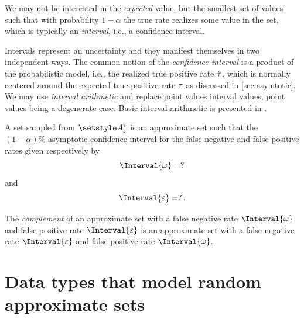 \documentclass[10pt,final,hidelinks]{article}
\numberwithin{equation}{section}
\begin{document}
We may not be interested in the \emph{expected} value, but the smallest set of values such that with probability $1-\alpha$ the true rate 
realizes some value in the set, which is typically an \emph{interval}, i.e., a confidence interval.

Intervals represent an uncertainty and they manifest themselves in two independent ways.
The common notion of the \emph{confidence interval} is a product of the probabilistic model, i.e., the realized true positive rate $\hat{\tau}$, which is normally centered around the expected true positive rate $\tau$ as discussed in \cref{sec:asymtotic}.
We may use \emph{interval arithmetic} and replace point values interval values, point values being a degenerate case.
Basic interval arithmetic is presented in \cite{basicinterval}.

A set sampled from $\ASet{A}[\fprate][\tprate]$ is an approximate set such that the $(1-\alpha)\%$ asymptotic confidence interval for the false negative and 
false positive rates given respectively by
\begin{equation}
\label{eq:fnrate_union_set}
\Interval{\fnrate} = ?
\end{equation}
and
\begin{equation}
\label{eq:fprate_union_set}
\Interval{\fprate} = ?\,.
\end{equation}


\begin{theorem}
\label{thm:uncertain_rates_comp_set}
The \emph{complement} of an approximate set with a false negative rate $\Interval{\fnrate}$ and false positive rate $\Interval{\fprate}$ is an approximate set with a false negative rate $\Interval{\fprate}$ and false positive rate $\Interval{\fnrate}$.
\end{theorem}

\providecommand{\mainx}{..}

\newcommand{\ctor}[2]{\APFun{F}[#1][#2]}

\section{Data types that model random approximate sets}
\label{sec:adt}

\end{document}
